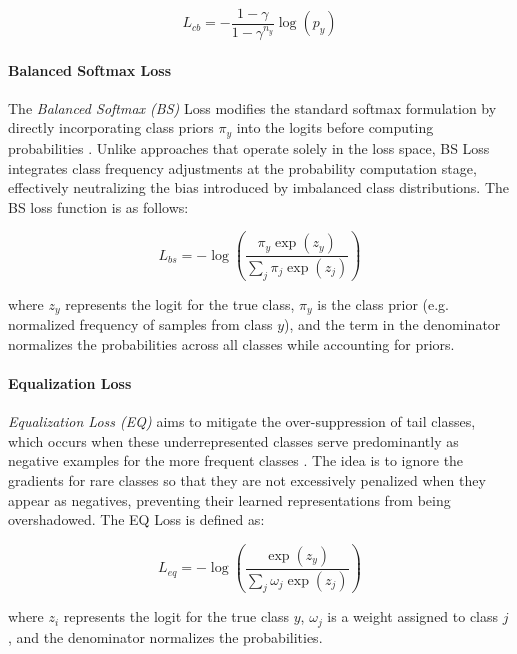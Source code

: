 \begin{equation}
    L_{cb} = - \frac{1 - \gamma}{1 - \gamma^{n_y}} \log(p_y)
\end{equation}


\paragraph{Balanced Softmax Loss}
The \emph{Balanced Softmax (BS)} Loss modifies the standard softmax formulation by directly incorporating class priors $\pi_y$ into the logits before computing probabilities \cite{ren2020balancedmetasoftmaxlongtailedvisual}. Unlike approaches that operate solely in the loss space, BS Loss integrates class frequency adjustments at the probability computation stage, effectively neutralizing the bias introduced by imbalanced class distributions. The BS loss function is as follows:

\begin{equation}
    L_{bs} = - \log\left( \frac{\pi_y \exp(z_y)}{\sum_j \pi_j \exp(z_j)} \right)
\end{equation}

where $z_y$ represents the logit for the true class, $\pi_y$ is the class prior (e.g. normalized frequency of samples from class $y$), and the term in the denominator normalizes the probabilities across all classes while accounting for priors.


\paragraph{Equalization Loss}
\emph{Equalization Loss (EQ)} aims to mitigate the over-suppression of tail classes, which occurs when these underrepresented classes serve predominantly as negative examples for the more frequent classes \cite{tan2020equalizationlosslongtailedobject}. The idea is to ignore the gradients for rare classes so that they are not excessively penalized when they appear as negatives, preventing their learned representations from being overshadowed. The EQ Loss is defined as:

\begin{equation}
    L_{eq} = - \log\left( \frac{\exp(z_y)}{\sum_j \omega_j \exp(z_j)} \right)
\end{equation}

where $z_i$ represents the logit for the true class $y$, $\omega_j$ is a weight assigned to class $j$, and the denominator normalizes the probabilities.


